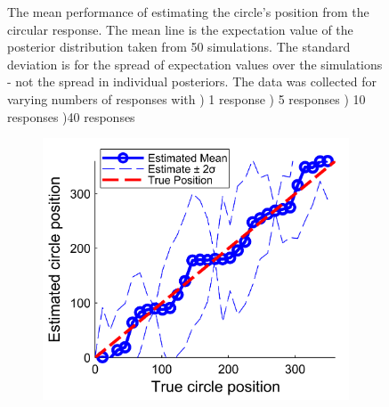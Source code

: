\begin{figure}
\begin{subfigure}{7cm}
	\caption{}	
	\label{Figure: circular_fusion_mean_40}
	\end{subfigure}
	\label{Figure: circular_fusion_mean}
	\caption{The mean performance of estimating the circle's position from the circular response. The mean line is the expectation value of the posterior distribution taken from 50 simulations. The standard deviation is for the spread of expectation values over the simulations - not the spread in individual posteriors. The data was collected for varying numbers of responses with ) 1 response ) 5 responses ) 10 responses )40 responses}
\end{figure}


\begin{figure}
	\centering
	\begin{subfigure}{7cm}
	\includegraphics[scale=1]{circular_line_fusion_mean_1report_gold.png}
	\caption{}	
	\label{Figure: circular_fusion_mean_1_gold}
	\end{subfigure}
	\begin{subfigure}{7cm}

\end{subfigure}
\end{figure}

